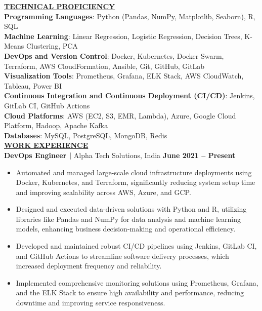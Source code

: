 \documentclass{article}
\begin{document}
\noindent \textbf{\underline{TECHNICAL PROFICIENCY}} \\
\textbf{Programming Languages}{: \small Python (Pandas, NumPy, Matplotlib, Seaborn), R, SQL} \\
\textbf{Machine Learning}{: \small Linear Regression, Logistic Regression, Decision Trees, K-Means Clustering, PCA} \\
\textbf{DevOps and Version Control}{: \small Docker, Kubernetes, Docker Swarm, Terraform, AWS CloudFormation, Ansible, Git, GitHub, GitLab} \\
\textbf{Visualization Tools}{: \small Prometheus, Grafana, ELK Stack, AWS CloudWatch, Tableau, Power BI} \\
\textbf{Continuous Integration and Continuous Deployment (CI/CD)}{: \small Jenkins, GitLab CI, GitHub Actions} \\
\textbf{Cloud Platforms}{: \small AWS (EC2, S3, EMR, Lambda), Azure, Google Cloud Platform, Hadoop, Apache Kafka} \\
\textbf{Databases}{: \small MySQL, PostgreSQL, MongoDB, Redis} \\

\noindent \textbf{\underline{WORK EXPERIENCE}} \\
\noindent \textbf{DevOps Engineer | } Alpha Tech Solutions, India  \hfill \textbf{June 2021 – Present}
\begin{itemize}[noitemsep,nolistsep,leftmargin=*]
\item {\small Automated and managed large-scale cloud infrastructure deployments using Docker, Kubernetes, and Terraform, significantly reducing system setup time and improving scalability across AWS, Azure, and GCP.}
\item {\small Designed and executed data-driven solutions with Python and R, utilizing libraries like Pandas and NumPy for data analysis and machine learning models, enhancing business decision-making and operational efficiency.}
\item {\small Developed and maintained robust CI/CD pipelines using Jenkins, GitLab CI, and GitHub Actions to streamline software delivery processes, which increased deployment frequency and reliability.}
\item {\small Implemented comprehensive monitoring solutions using Prometheus, Grafana, and the ELK Stack to ensure high availability and performance, reducing downtime and improving service responsiveness.}
\end{itemize}
\end{document}
